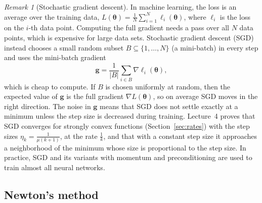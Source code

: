 \documentclass[11pt]{article}
\theoremstyle{definition}
\theoremstyle{plain}
\theoremstyle{remark}
\newtheorem{remark}[definition]{Remark}
\begin{document}
\begin{remark}[Stochastic gradient descent]\label{rem:sgd}
    In machine learning, the loss is an average over the training data, $L(\boldsymbol{\theta}) = \frac{1}{N}\sum_{i=1}^N \ell_i(\boldsymbol{\theta})$, where $\ell_i$ is the loss on the $i$-th data point. Computing the full gradient needs a pass over all $N$ data points, which is expensive for large data sets. Stochastic gradient descent (SGD) instead chooses a small random subset $B \subseteq \{1, \ldots, N\}$ (a mini-batch) in every step and uses the mini-batch gradient
    \[\mathbf{g} = \frac{1}{|B|}\sum_{i \in B} \nabla\ell_i(\boldsymbol{\theta}),\]
    which is cheap to compute. If $B$ is chosen uniformly at random, then the expected value of $\mathbf{g}$ is the full gradient $\nabla L(\boldsymbol{\theta})$, so on average SGD moves in the right direction. The noise in $\mathbf{g}$ means that SGD does not settle exactly at a minimum unless the step size is decreased during training. Lecture~4 proves that SGD converges for strongly convex functions (Section~\ref{sec:rates}) with the step sizes $\eta_k = \frac{1}{\mu(k + 1)}$, at the rate $\frac{1}{k}$, and that with a constant step size it approaches a neighborhood of the minimum whose size is proportional to the step size. In practice, SGD and its variants with momentum and preconditioning are used to train almost all neural networks.
\end{remark}

\subsection{Newton's method}\label{sec:newton}
\end{document}
